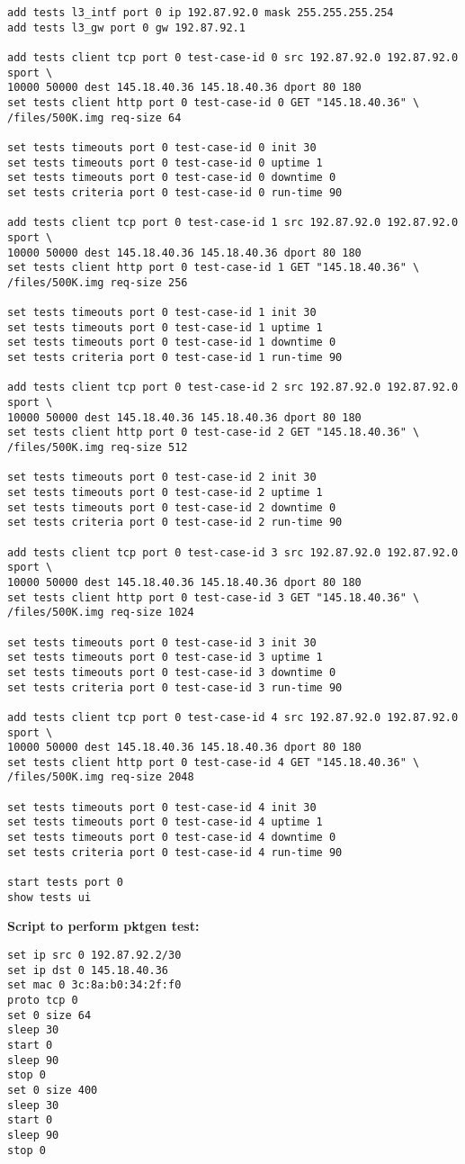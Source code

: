 \begin{verbatim}
add tests l3_intf port 0 ip 192.87.92.0 mask 255.255.255.254
add tests l3_gw port 0 gw 192.87.92.1

add tests client tcp port 0 test-case-id 0 src 192.87.92.0 192.87.92.0 sport \ 
10000 50000 dest 145.18.40.36 145.18.40.36 dport 80 180
set tests client http port 0 test-case-id 0 GET "145.18.40.36" \
/files/500K.img req-size 64

set tests timeouts port 0 test-case-id 0 init 30
set tests timeouts port 0 test-case-id 0 uptime 1
set tests timeouts port 0 test-case-id 0 downtime 0
set tests criteria port 0 test-case-id 0 run-time 90

add tests client tcp port 0 test-case-id 1 src 192.87.92.0 192.87.92.0 sport \ 
10000 50000 dest 145.18.40.36 145.18.40.36 dport 80 180
set tests client http port 0 test-case-id 1 GET "145.18.40.36" \
/files/500K.img req-size 256

set tests timeouts port 0 test-case-id 1 init 30
set tests timeouts port 0 test-case-id 1 uptime 1
set tests timeouts port 0 test-case-id 1 downtime 0
set tests criteria port 0 test-case-id 1 run-time 90

add tests client tcp port 0 test-case-id 2 src 192.87.92.0 192.87.92.0 sport \ 
10000 50000 dest 145.18.40.36 145.18.40.36 dport 80 180
set tests client http port 0 test-case-id 2 GET "145.18.40.36" \
/files/500K.img req-size 512

set tests timeouts port 0 test-case-id 2 init 30
set tests timeouts port 0 test-case-id 2 uptime 1
set tests timeouts port 0 test-case-id 2 downtime 0
set tests criteria port 0 test-case-id 2 run-time 90

add tests client tcp port 0 test-case-id 3 src 192.87.92.0 192.87.92.0 sport \ 
10000 50000 dest 145.18.40.36 145.18.40.36 dport 80 180
set tests client http port 0 test-case-id 3 GET "145.18.40.36" \
/files/500K.img req-size 1024

set tests timeouts port 0 test-case-id 3 init 30
set tests timeouts port 0 test-case-id 3 uptime 1
set tests timeouts port 0 test-case-id 3 downtime 0
set tests criteria port 0 test-case-id 3 run-time 90

add tests client tcp port 0 test-case-id 4 src 192.87.92.0 192.87.92.0 sport \ 
10000 50000 dest 145.18.40.36 145.18.40.36 dport 80 180
set tests client http port 0 test-case-id 4 GET "145.18.40.36" \
/files/500K.img req-size 2048

set tests timeouts port 0 test-case-id 4 init 30
set tests timeouts port 0 test-case-id 4 uptime 1
set tests timeouts port 0 test-case-id 4 downtime 0
set tests criteria port 0 test-case-id 4 run-time 90

start tests port 0
show tests ui
\end{verbatim}
\textbf{Script to perform pktgen test:}
\begin{verbatim}
set ip src 0 192.87.92.2/30
set ip dst 0 145.18.40.36
set mac 0 3c:8a:b0:34:2f:f0
proto tcp 0
set 0 size 64
sleep 30
start 0
sleep 90
stop 0
set 0 size 400
sleep 30
start 0
sleep 90
stop 0
\end{verbatim}

